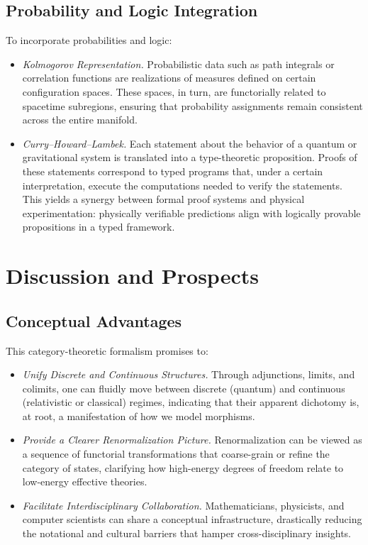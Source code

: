 \documentclass[12pt]{article}
\begin{document}
\subsection{Probability and Logic Integration}
To incorporate probabilities and logic:
\begin{itemize}
    \item \textit{Kolmogorov Representation.} Probabilistic data such as path integrals or correlation functions are realizations of measures defined on certain configuration spaces. These spaces, in turn, are functorially related to spacetime subregions, ensuring that probability assignments remain consistent across the entire manifold.
    \item \textit{Curry--Howard--Lambek.} Each statement about the behavior of a quantum or gravitational system is translated into a type-theoretic proposition. Proofs of these statements correspond to typed programs that, under a certain interpretation, execute the computations needed to verify the statements. This yields a synergy between formal proof systems and physical experimentation: physically verifiable predictions align with logically provable propositions in a typed framework.
\end{itemize}

\section{Discussion and Prospects}

\subsection{Conceptual Advantages}
This category-theoretic formalism promises to:
\begin{itemize}
\item \textit{Unify Discrete and Continuous Structures.} Through adjunctions, limits, and colimits, one can fluidly move between discrete (quantum) and continuous (relativistic or classical) regimes, indicating that their apparent dichotomy is, at root, a manifestation of how we model morphisms.
\item \textit{Provide a Clearer Renormalization Picture.} Renormalization can be viewed as a sequence of functorial transformations that coarse-grain or refine the category of states, clarifying how high-energy degrees of freedom relate to low-energy effective theories.
\item \textit{Facilitate Interdisciplinary Collaboration.} Mathematicians, physicists, and computer scientists can share a conceptual infrastructure, drastically reducing the notational and cultural barriers that hamper cross-disciplinary insights.
\end{itemize}
\end{document}
